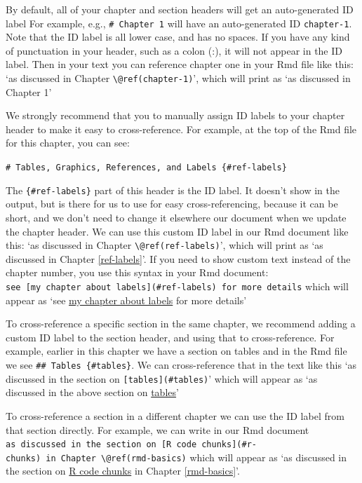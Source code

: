 \documentclass[print]{nuthesis}
\begin{document}
By default, all of your chapter and section headers will get an auto-generated ID label For example, e.g., \texttt{\#\ Chapter\ 1} will have an auto-generated ID \texttt{chapter-1}. Note that the ID label is all lower case, and has no spaces. If you have any kind of punctuation in your header, such as a colon (:), it will not appear in the ID label. Then in your text you can reference chapter one in your Rmd file like this: `as discussed in Chapter \texttt{\textbackslash{}@ref(chapter-1)}', which will print as `as discussed in Chapter 1'

We strongly recommend that you to manually assign ID labels to your chapter header to make it easy to cross-reference. For example, at the top of the Rmd file for this chapter, you can see:

\texttt{\#\ Tables,\ Graphics,\ References,\ and\ Labels\ \{\#ref-labels\}}

The \texttt{\{\#ref-labels\}} part of this header is the ID label. It doesn't show in the output, but is there for us to use for easy cross-referencing, because it can be short, and we don't need to change it elsewhere our document when we update the chapter header. We can use this custom ID label in our Rmd document like this: `as discussed in Chapter \texttt{\textbackslash{}@ref(ref-labels)}', which will print as `as discussed in Chapter \ref{ref-labels}'. If you need to show custom text instead of the chapter number, you use this syntax in your Rmd document: \texttt{see\ {[}my\ chapter\ about\ labels{]}(\#ref-labels)\ for\ more\ details} which will appear as `see \protect\hyperlink{ref-labels}{my chapter about labels} for more details'

To cross-reference a specific section in the same chapter, we recommend adding a custom ID label to the section header, and using that to cross-reference. For example, earlier in this chapter we have a section on tables and in the Rmd file we see \texttt{\#\#\ Tables\ \{\#tables\}}. We can cross-reference that in the text like this `as discussed in the section on \texttt{{[}tables{]}(\#tables)}' which will appear as `as discussed in the above section on \protect\hyperlink{tables}{tables}'

To cross-reference a section in a different chapter we can use the ID label from that section directly. For example, we can write in our Rmd document \texttt{as\ discussed\ in\ the\ section\ on\ {[}R\ code\ chunks{]}(\#r-chunks)\ in\ Chapter\ \textbackslash{}@ref(rmd-basics)} which will appear as `as discussed in the section on \protect\hyperlink{r-chunks}{R code chunks} in Chapter \ref{rmd-basics}'.
\end{document}
